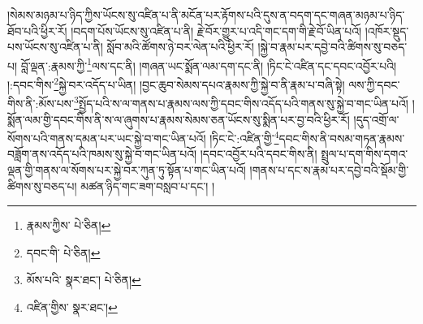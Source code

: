 །སེམས་མཉམ་པ་ཉིད་ཀྱིས་ཡོངས་སུ་འཛིན་པ་ནི་མངོན་པར་རྟོགས་པའི་དུས་ན་བདག་དང་གཞན་མཉམ་པ་ཉིད་ཐོབ་པའི་ཕྱིར་རོ། །བདག་པོས་ཡོངས་སུ་འཛིན་པ་ནི། རྗེ་བོར་གྱུར་པ་འདི་གང་དག་གི་རྗེ་བོ་ཡིན་པའོ། །འཁོར་སྡུད་པས་ཡོངས་སུ་འཛིན་པ་ནི། སློབ་མའི་ཚོགས་ཉེ་བར་ལེན་པའི་ཕྱིར་རོ། །སྐྱེ་བ་རྣམ་པར་དབྱེ་བའི་ཚིགས་སུ་བཅད་པ། བློ་ལྡན་:རྣམས་ཀྱི་\footnote{རྣམས་ཀྱིས་  པེ་ཅིན། }ལས་དང་ནི། །གཞན་ཡང་སྨོན་ལམ་དག་དང་ནི། །ཏིང་ངེ་འཛིན་དང་དབང་འབྱོར་པའི། །:དབང་གིས་\footnote{དབང་གི་  པེ་ཅིན། }སྐྱེ་བར་འདོད་པ་ཡིན། །བྱང་ཆུབ་སེམས་དཔའ་རྣམས་ཀྱི་སྐྱེ་བ་ནི་རྣམ་པ་བཞི་སྟེ། ལས་ཀྱི་དབང་གིས་ནི་:མོས་པས་\footnote{མོས་པའི་  སྣར་ཐང་།  པེ་ཅིན། }སྤྱོད་པའི་ས་ལ་གནས་པ་རྣམས་ལས་ཀྱི་དབང་གིས་འདོད་པའི་གནས་སུ་སྐྱེ་བ་གང་ཡིན་པའོ། །སྨོན་ལམ་གྱི་དབང་གིས་ནི་ས་ལ་ཞུགས་པ་རྣམས་སེམས་ཅན་ཡོངས་སུ་སྨིན་པར་བྱ་བའི་ཕྱིར་རོ། །དུད་འགྲོ་ལ་སོགས་པའི་གནས་དམན་པར་ཡང་སྐྱེ་བ་གང་ཡིན་པའོ། །ཏིང་ངེ་:འཛིན་གྱི་\footnote{འཛིན་གྱིས་  སྣར་ཐང་། }དབང་གིས་ནི་བསམ་གཏན་རྣམས་བཟློག་ནས་འདོད་པའི་ཁམས་སུ་སྐྱེ་བ་གང་ཡིན་པའོ། །དབང་འབྱོར་པའི་དབང་གིས་ནི། སྤྲུལ་པ་དག་གིས་དགའ་ལྡན་གྱི་གནས་ལ་སོགས་པར་སྐྱེ་བར་ཀུན་ཏུ་སྟོན་པ་གང་ཡིན་པའོ། །གནས་པ་དང་ས་རྣམ་པར་དབྱེ་བའི་སྡོམ་གྱི་ཚིགས་སུ་བཅད་པ། མཚན་ཉིད་གང་ཟག་བསླབ་པ་དང་། །
